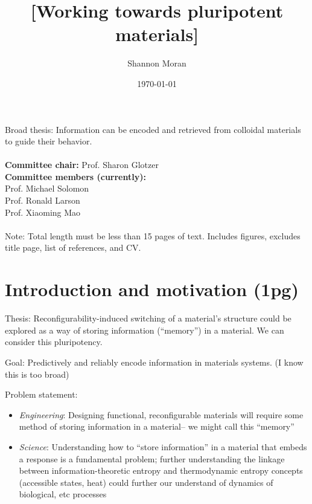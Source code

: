 \documentclass[12pt, oneside]{article}   	%
\title{[Working towards pluripotent materials]}
\author{Shannon Moran}
\date{\today}
\begin{document}
\maketitle
\thispagestyle{empty}
\noindent
Broad thesis: Information can be encoded and retrieved from colloidal materials to guide their behavior.
\\ \\
\textbf{Committee chair:} Prof. Sharon Glotzer \\ \textbf{Committee members (currently):} \\ Prof. Michael Solomon \\ Prof. Ronald Larson \\ Prof. Xiaoming Mao
\\ \\
Note: Total length must be less than 15 pages of text. Includes figures, excludes title page, list of references, and CV.



\newpage


\section{Introduction and motivation (1pg)}


Thesis: Reconfigurability-induced switching of a material's structure could be explored as a way of storing information (``memory'') in a material. We can consider this pluripotency.

Goal: Predictively and reliably encode information in materials systems. (I know this is too broad)

Problem statement:
\begin{itemize}
\item \textit{Engineering}: Designing functional, reconfigurable materials will require some method of storing information in a material-- we might call this ``memory''
\item \textit{Science}: Understanding how to ``store information'' in a material that embeds a response is a fundamental problem; further understanding the linkage between information-theoretic entropy and thermodynamic entropy concepts (accessible states, heat) could further our understand of dynamics of biological, etc processes
\end{itemize}
\end{document}
